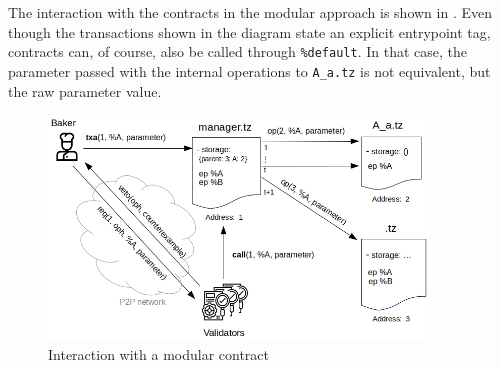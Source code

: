 The interaction with the contracts in the modular approach is shown in . Even though the transactions shown in the diagram state an explicit entrypoint tag, contracts can, of course, also be called through \texttt{\%default}. In that case, the parameter passed with the internal operations to \texttt{A\_a.tz} is not equivalent, but the raw parameter value.
\begin{figure}[h]
\centering
  \includegraphics[width=0.9\textwidth]{figures/5-offline_tezos/interaction_modular.jpg}
	\caption{Interaction with a modular contract}
	\label{fig:interaction_modular}
\end{figure}

